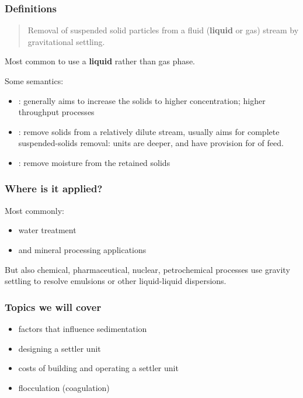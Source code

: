 \begin{frame}\frametitle{Definitions}
	{}
	\begin{quote}
		Removal of suspended solid particles from a fluid (\textbf{liquid} or gas) stream by gravitational settling.
	\end{quote}
	Most common to use a \textbf{liquid} rather than gas phase.

	\vspace{12pt}
	Some semantics:
	\begin{itemize}
		\item	{\color{purple}{Thickening}}: generally aims to increase the solids to higher concentration; higher throughput processes
		
		\vspace{12pt}
		\item	{\color{purple}{Clarification}}: remove solids from a relatively dilute stream, usually aims for complete suspended-solids removal: units are deeper, and have provision for {\color{purple}{coagulation}} of feed.
		
		\vspace{12pt}
		\item	{\color{purple}{Dewatering}}: remove moisture from the retained solids
	\end{itemize}
\end{frame}

\begin{frame}\frametitle{Where is it applied?}
	Most commonly:
	\begin{itemize}
		\item	water treatment
		\item	and mineral processing applications
	\end{itemize}

	\vspace{12pt}
	But also chemical, pharmaceutical, nuclear, petrochemical processes use gravity settling to resolve emulsions or other liquid-liquid dispersions. 
\end{frame}

\begin{frame}\frametitle{Topics we will cover}
	\begin{itemize}
		\item	factors that influence sedimentation
		\item	designing a settler unit
		\item	costs of building and operating a settler unit
		\item	flocculation (coagulation)
	\end{itemize}
\end{frame}

